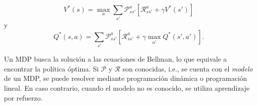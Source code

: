 \[
V^*(s) = \max_{a}\sum_{s'}\mathcal{P}_{ss'}^a[\mathcal{R}_{ss'}^a + \gamma V^*(s')]
\]
y 
\[
Q^*(s,a) = \sum_{s'}\mathcal{P}_{ss'}^a[\mathcal{R}_{ss'}^a + \gamma \max_{a'}Q^*(s',a')].
\]

Un MDP busca la solución a las ecuaciones de Bellman, lo que equivale a encontrar
la política óptima. Si $\mathcal{P}$ y $\mathcal{R}$ son conocidas, i.e., se cuenta con el \textit{modelo} de un MDP, se puede resolver mediante programación dinámica o programación lineal. En caso contrario, cuando el modelo no es conocido, se utiliza aprendizaje por refuerzo.







